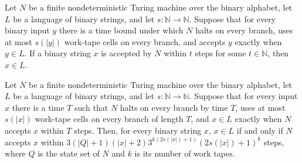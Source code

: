 \begin{theorem}
\label{Turing.FinNDTM.DecidesInSpace.mem_of_acceptsWithin}
\leanok
{}
Let $N$ be a finite nondeterministic Turing machine over the binary alphabet, let $L$ be
a language of binary strings, and let $s\colon\mathbb{N}\to\mathbb{N}$. Suppose that for
every binary input $y$ there is a time bound under which $N$ halts on every branch, uses
at most $s(|y|)$ work-tape cells on every branch, and accepts $y$ exactly when $y\in L$.
If a binary string $x$ is accepted by $N$ within $t$ steps for some $t\in\mathbb{N}$,
then $x\in L$.
\end{theorem}

\begin{theorem}
\label{Turing.FinNDTM.DecidesInSpace.mem_iff_acceptsWithin_configBound}
\leanok
{}
Let $N$ be a finite nondeterministic Turing machine over the binary alphabet, let $L$ be
a language of binary strings, and let $s\colon\mathbb{N}\to\mathbb{N}$. Suppose that for
every input $x$ there is a time $T$ such that $N$ halts on every branch by time $T$,
uses at most $s(|x|)$ work-tape cells on every branch of length $T$, and $x\in L$
exactly when $N$ accepts $x$ within $T$ steps. Then, for every binary string $x$, $x\in
L$ if and only if $N$ accepts $x$ within $3(\lvert
Q\rvert+1)(|x|+2)3^{k(2s(|x|)+1)}(2s(|x|)+1)^k$ steps, where $Q$ is the state set of $N$
and $k$ is its number of work tapes.
\end{theorem}
